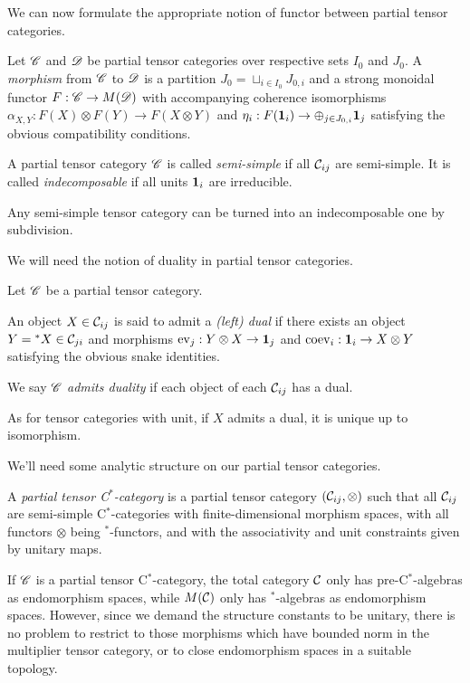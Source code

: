 We can now formulate the appropriate notion of functor between partial tensor categories.

\begin{Def} Let $\mathscr{C}$ and $\mathscr{D}$ be partial tensor categories over respective sets $I_0$ and $J_0$. A \emph{morphism} from $\mathscr{C}$ to $\mathscr{D}$ is a partition $J_0 = \sqcup_{i\in I_0} J_{0,i}$ and a strong monoidal functor $F: \mathscr{C}\rightarrow M(\mathscr{D})$ with accompanying coherence isomorphisms $\alpha_{X,Y}: F(X)\otimes F(Y) \rightarrow F(X\otimes Y)$ and $\eta_i: F(\mathbf{1}_i) \rightarrow \oplus_{j\in J_{0,i}} \mathbf{1}_j$ satisfying the obvious compatibility conditions. %
\end{Def}

\begin{Def} A partial tensor category $\mathscr{C}$ is called \emph{semi-simple} if all $\mathcal{C}_{ij}$ are semi-simple. It is called \emph{indecomposable} if all units $\mathbf{1}_i$ are irreducible. %
\end{Def}

Any semi-simple tensor category can be turned into an indecomposable one by subdivision. 

We will need the notion of duality in partial tensor categories.

\begin{Def} Let $\mathscr{C}$ be a partial tensor category. 

An object $X\in \mathcal{C}_{ij}$ is said to admit a \emph{(left) dual} if there exists an object $Y={}^*X \in \mathcal{C}_{ji}$ and morphisms $\mathrm{ev}_{j}: Y\otimes X \rightarrow \mathbf{1}_j$ and $\mathrm{coev}_i: \mathbf{1}_i\rightarrow X\otimes Y$ satisfying the obvious snake identities.

We say $\mathscr{C}$ \emph{admits duality} if each object of each $\mathcal{C}_{ij}$ has a dual.
\end{Def}

As for tensor categories with unit, if $X$ admits a dual, it is unique up to isomorphism. 

We'll need some analytic structure on our partial tensor categories.

\begin{Def} A \emph{partial tensor C$^*$-category} is a partial tensor category $(\mathcal{C}_{ij},\otimes)$ such that all $\mathcal{C}_{ij}$ are semi-simple C$^*$-categories with finite-dimensional morphism spaces, with all functors $\otimes$ being $^*$-functors, and with the associativity and unit constraints given by unitary maps.   
\end{Def} 

\begin{Rem} If $\mathscr{C}$ is a partial tensor C$^*$-category, the total category $\mathcal{C}$ only has pre-C$^*$-algebras as endomorphism spaces, while $M(\mathcal{C})$ only has $^*$-algebras as endomorphism spaces. However, since we demand the structure constants to be unitary, there is no problem to restrict to those morphisms which have bounded norm in the multiplier tensor category, or to close endomorphism spaces in a suitable topology. %
\end{Rem}

